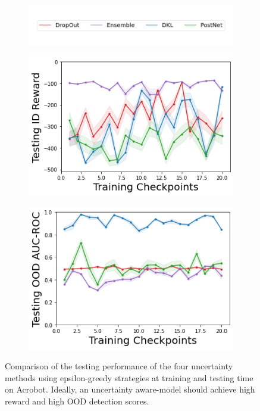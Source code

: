 \begin{figure}
    \centering
        \begin{subfigure}{.5\textwidth}
        \includegraphics[width=\textwidth]{sections/011_icml2022/resources/legend.png}
    \end{subfigure}
    \vspace{-5mm}
    
    \begin{subfigure}{.4\textwidth}
        \includegraphics[width=\textwidth]{sections/011_icml2022/resources/Acrobot-v1-mean_reward_-testing-model.png}  
    \end{subfigure}
    \begin{subfigure}{.4\textwidth}
        \includegraphics[width=\textwidth]{sections/011_icml2022/resources/AcrobotOOD-v0-AUC-ROC-epistemic_-testing-model.png}
    \end{subfigure}
    \caption{Comparison of the testing performance of the four uncertainty methods using epsilon-greedy strategies at training and testing time on Acrobot. Ideally, an uncertainty aware-model should achieve high reward and high OOD detection scores.}
    \label{fig:model-testing-performance-acrobot}
\end{figure}
